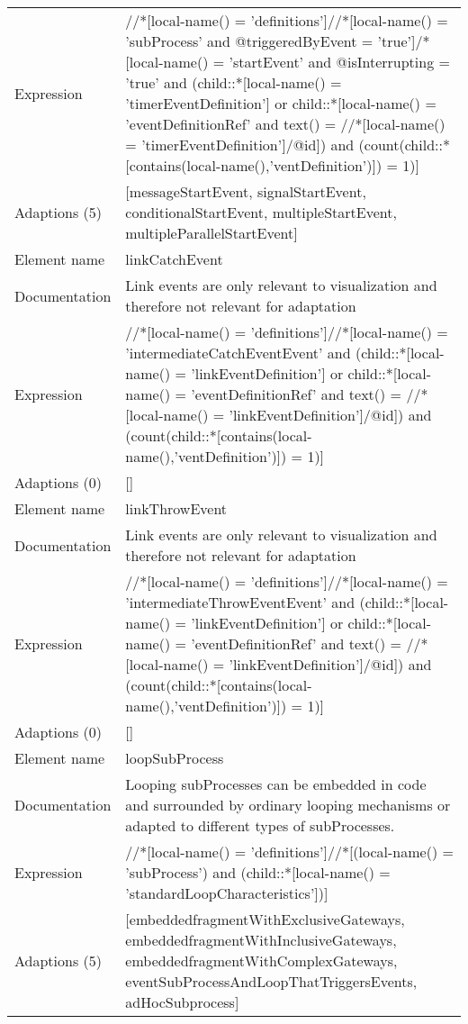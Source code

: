 \begin{center}
\begin{tiny}
\begin{longtable}{p{}|p{}}
Expression & //*[local-name() = 'definitions']//*[local-name() = 'subProcess' and @triggeredByEvent = 'true']/*[local-name() = 'startEvent' and @isInterrupting = 'true' and (child::*[local-name() = 'timerEventDefinition'] or child::*[local-name() = 'eventDefinitionRef' and text() = //*[local-name() = 'timerEventDefinition']/@id]) and (count(child::*[contains(local-name(),'ventDefinition')]) = 1)]\\
\myrowcolour
Adaptions (5) & [messageStartEvent, signalStartEvent, conditionalStartEvent, multipleStartEvent, multipleParallelStartEvent]\\
\midrule
Element name & linkCatchEvent\\
\myrowcolour
Documentation &Link events are only relevant to visualization and therefore not relevant for adaptation\\
Expression & //*[local-name() = 'definitions']//*[local-name() = 'intermediateCatchEventEvent' and (child::*[local-name() = 'linkEventDefinition'] or child::*[local-name() = 'eventDefinitionRef' and text() = //*[local-name() = 'linkEventDefinition']/@id]) and (count(child::*[contains(local-name(),'ventDefinition')]) = 1)]\\
\myrowcolour
Adaptions (0) & []\\
\midrule
Element name & linkThrowEvent\\
\myrowcolour
Documentation &Link events are only relevant to visualization and therefore not relevant for adaptation\\
Expression & //*[local-name() = 'definitions']//*[local-name() = 'intermediateThrowEventEvent' and (child::*[local-name() = 'linkEventDefinition'] or child::*[local-name() = 'eventDefinitionRef' and text() = //*[local-name() = 'linkEventDefinition']/@id]) and (count(child::*[contains(local-name(),'ventDefinition')]) = 1)]\\
\myrowcolour
Adaptions (0) & []\\
\midrule
Element name & loopSubProcess\\
\myrowcolour
Documentation &Looping subProcesses can be embedded in code and surrounded by ordinary looping mechanisms or adapted to different types of subProcesses.\\
Expression & //*[local-name() = 'definitions']//*[(local-name() = 'subProcess') and (child::*[local-name() = 'standardLoopCharacteristics'])]\\
\myrowcolour
Adaptions (5) & [embeddedfragmentWithExclusiveGateways, embeddedfragmentWithInclusiveGateways, embeddedfragmentWithComplexGateways, eventSubProcessAndLoopThatTriggersEvents, adHocSubprocess]\\

\end{longtable}
\end{tiny}
\end{center}
